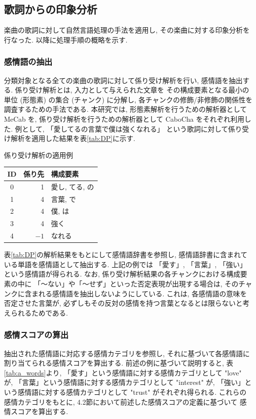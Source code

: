 \documentclass{jpreprint}
\begin{document}
\begin{multicols}{2}
\subsection{歌詞からの印象分析}
楽曲の歌詞に対して自然言語処理の手法を適用し,
その楽曲に対する印象分析を行なった.
以降に処理手順の概略を示す.

\subsubsection{感情語の抽出}
分類対象となる全ての楽曲の歌詞に対して係り受け解析を行い,
感情語を抽出する.
係り受け解析とは,
入力として与えられた文章を
その構成要素となる最小の単位 (形態素) の集合 (チャンク) に分解し,
各チャンクの修飾/非修飾の関係性を調査するための手法である.
本研究では,
形態素解析を行うための解析器として MeCab\cite{MeCab} を,
係り受け解析を行うための解析器として CaboCha\cite{CaboCha} をそれぞれ利用した.
例として,
「愛してるの言葉で僕は強くなれる」
という歌詞に対して係り受け解析を適用した結果を表\ref{tab:DP}に示す.

\begin{tablehere}
  \begin{center}
  \caption{係り受け解析の適用例}
  \label{tab:DP}
  \begin{tabular}{c|r|l}
    \hline
    \hline
    ID & 係り先 & 構成要素\\
    \hline
    0 & 1 & {愛し, てる, の}  \\
    1 & 4 & {言葉, で} \\
    2 & 4 & {僕, は} \\
    3 & 4 & {強く} \\
    4 & $-1$ & {なれる} \\
    \hline
    \hline
  \end{tabular}
  \end{center}
\end{tablehere}

表\ref{tab:DP}の解析結果をもとにして感情語辞書を参照し,
感情語辞書に含まれている単語を感情語として抽出する.
上記の例では
「愛す」, 「言葉」, 「強い」
という感情語が得られる.
なお,
係り受け解析結果の各チャンクにおける構成要素の中に
「〜ない」や「〜せず」といった否定表現が出現する場合は,
そのチャンクに含まれる感情語を抽出しないようにしている.
これは,
各感情語の意味を否定させた言葉が,
必ずしもその反対の感情を持つ言葉となるとは限らないと考えられるためである.

\subsubsection{感情スコアの算出}
抽出された感情語に対応する感情カテゴリを参照し,
それに基づいて各感情語に割り当てられる感情スコアを算出する.
前述の例に基づいて説明すると,
表\ref{tab:a_words}より,
「愛す」という感情語に対する感情カテゴリとして "love" が,
「言葉」という感情語に対する感情カテゴリとして "interest" が,
「強い」という感情語に対する感情カテゴリとして "trust" がそれぞれ得られる.
これらの感情カテゴリをもとに,
4.2節において前述した感情スコアの定義に基づいて
感情スコアを算出する.


\end{multicols}
\end{document}
